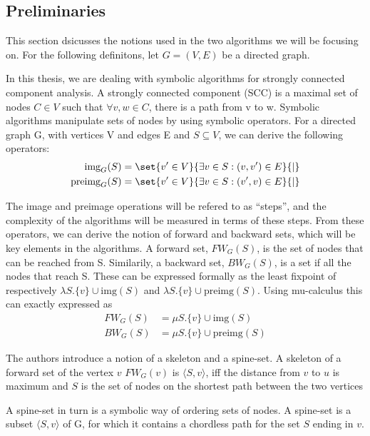 \documentclass[../master/master.tex]{subfiles}
\newcommand{\FW}[2][G]{\ensuremath{FW_{#1}(#2)}}
\newcommand{\BW}[2][G]{\ensuremath{BW_{#1}(#2)}}
\newcommand{\pair}[2]{\ensuremath{\langle #1, #2\rangle}}
\newcommand{\img}[2][G]{\ensuremath{\text{img}_{#1}(#2)}}
\newcommand{\pre}[2][G]{\ensuremath{\text{preimg}_{#1}(#2)}}
\begin{document}
\subsection{Preliminaries}

This section dsicusses the notions used in the two algorithms we will be focusing on. For the following definitons, let $G=(V,E)$ be a directed graph.

In this thesis, we are dealing with symbolic algorithms for strongly connected component analysis. A strongly connected component (SCC) is a maximal set of nodes $C\in V$ such that $\forall v,w\in C$, there is a path from v to w. Symbolic algorithms manipulate sets of nodes by using symbolic operators. For a directed graph G, with vertices V and edges E and $S\subseteq V$, we can derive the following operators: 
\begin{align*}
\img S &= \set{v' \in V}{\exists v\in S:(v, v')\in E}{|}\\
\pre S &= \set{v' \in V}{\exists v\in S:(v', v)\in E}{|}
\end{align*}

The image and preimage operations will be refered to as ``steps'', and the complexity of the algorithms will be measured in terms of these steps.
From these operators, we can derive the notion of forward and backward sets, which will be key elements in the algorithms. A forward set, \FW{S}, is the set of nodes that can be reached from S. Similarily, a backward set, \BW{S}, is a set if all the nodes that reach S. These can be expressed formally as the least fixpoint of respectively $\lambda S.\{v\}\cup \text{img}(S)$ and $\lambda S.\{v\}\cup \text{preimg}(S)$. Using mu-calculus \cite{clarke_peled_grumberg_1999} this can exactly expressed as 
\begin{align}\label{fw}
\FW{S} &= \mu S.\{v\}\cup \text{img}(S)\\
\label{bw}\BW{S} &= \mu S.\{v\}\cup \text{preimg}(S)
\end{align}

The authors \cite{linear} introduce a notion of a skeleton and a spine-set. A skeleton of a forward set of the vertex $v$ \FW{v} is \pair{S}{v}, iff the distance from $v$ to $u$ is maximum and $S$ is the set of nodes on the shortest path between the two vertices

A spine-set in turn is a symbolic way of ordering sets of nodes. A spine-set is a subset \pair{S}{v} of G, for which it contains a chordless path for the set $S$ ending in $v$.
\end{document}
